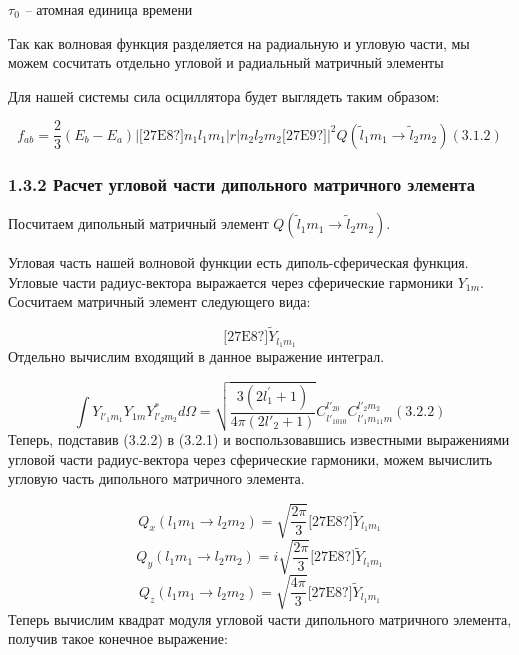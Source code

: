 \documentclass[a4paper]{article}
\begin{document}
 $\tau _0$\textit{ -- }атомная
единица времени

Так как волновая функция разделяется на радиальную и угловую части, мы можем сосчитать отдельно угловой и радиальный матричный элементы

Для нашей системы сила осциллятора будет выглядеть таким образом:

\begin{equation*}
f_{\mathit{ab}}=\frac 2
3\left(E_b-E_a\right)\left|\text{[27E8?]}n_1l_1m_1\left|r\left|n_2l_2m_2\text{[27E9?]}\right.\right.\right|^2Q\left(\widetilde
l_1m_1\rightarrow \widetilde l_2m_2\right)(3.1.2)
\end{equation*}
\subsubsection[1.3.2 Расчет угловой
части дипольного матричного
элемента]{1.3.2 Расчет
угловой части дипольного матричного
элемента}
\hypertarget{RefHeading4691463868395}{}Посчитаем
дипольный матричный
элемент  $Q\left(\widetilde l_1m_1\rightarrow \widetilde l_2m_2\right)$.

Угловая часть нашей волновой функции есть диполь-сферическая функция. Угловые части радиус-вектора выражается через сферические
гармоники  $Y_{1m}$.
Сосчитаем матричный элемент следующего вида:

\begin{equation*}
\text{[27E8?]}\widetilde Y_{l_1m_1}
\end{equation*}
Отдельно вычислим входящий в данное выражение интеграл.

\begin{equation*}
\int Y_{l'_1m_1}Y_{1m}Y_{l'_2m_2}^{\ast }\mathit{d\Omega }=\sqrt{\frac{3(2l^'_1+1)}{4\pi
(2l'_2+1)}}C_{l'_1010}^{l'_20}C_{l'_1m_11m}^{l'_2m_2}(3.2.2)
\end{equation*}
Теперь, подставив (3.2.2) в (3.2.1) и воспользовавшись известными выражениями угловой части радиус-вектора через сферические гармоники, можем вычислить угловую часть дипольного матричного элемента.

\begin{equation*}
Q_x\left(l_1m_1\rightarrow l_2m_2\right)=\sqrt{\frac{2\pi } 3}\text{[27E8?]}\widetilde Y_{l_1m_1}
\end{equation*}
\begin{equation*}
Q_y\left(l_1m_1\rightarrow l_2m_2\right)=i\sqrt{\frac{2\pi } 3}\text{[27E8?]}\widetilde Y_{l_1m_1}
\end{equation*}
\begin{equation*}
Q_z\left(l_1m_1\rightarrow l_2m_2\right)=\sqrt{\frac{4\pi } 3}\text{[27E8?]}\widetilde Y_{l_1m_1}
\end{equation*}
Теперь вычислим квадрат модуля угловой части дипольного матричного элемента, получив такое конечное выражение:
\end{document}
